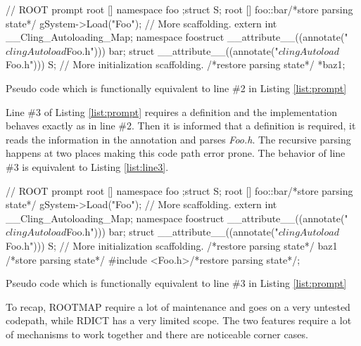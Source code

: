 \documentclass{webofc}
\begin{document}
\begin{listing}[h]
    \noindent
    \begin{minipage}[h]{.7\textwidth}
    \begin{cppcode*}{}
    // ROOT prompt
    root [] namespace foo { };struct S;
    root [] foo::bar/*store parsing state*/
        gSystem->Load("Foo");
        // More scaffolding.
        extern int __Cling_Autoloading_Map;
        namespace foo{struct __attribute__((annotate("$clingAutoload$Foo.h"))) bar;}
        struct __attribute__((annotate("$clingAutoload$Foo.h"))) S;
        // More initialization scaffolding.
        /*restore parsing state*/ *baz1;
    \end{cppcode*}
    \end{minipage}
    \caption{Pseudo code which is functionally equivalent to line \#2 in Listing \ref{list:prompt}}
    \label{list:line2}
\end{listing}

Line \#3 of Listing \ref{list:prompt} requires a definition and the implementation behaves exactly as in line \#2. Then it is informed that a definition is required, it reads the information in the annotation and parses {\it Foo.h}. The recursive parsing happens at two places making this code path error prone. The behavior of line \#3 is equivalent to Listing \ref{list:line3}.

\begin{listing}[h]
    \noindent
    \begin{minipage}[h]{.7\textwidth}
    \begin{cppcode*}{}
    // ROOT prompt
    root [] namespace foo { };struct S;
    root [] foo::bar/*store parsing state*/
        gSystem->Load("Foo");
        // More scaffolding.
        extern int __Cling_Autoloading_Map;
        namespace foo{struct __attribute__((annotate("$clingAutoload$Foo.h"))) bar;}
        struct __attribute__((annotate("$clingAutoload$Foo.h"))) S;
        // More initialization scaffolding.
        /*restore parsing state*/ baz1 /*store parsing state*/
        #include <Foo.h>/*restore parsing state*/;
    \end{cppcode*}
    \end{minipage}
    \caption{Pseudo code which is functionally equivalent to line \#3 in Listing \ref{list:prompt}}
    \label{list:line3}
\end{listing}

To recap, ROOTMAP require a lot of maintenance and goes on a very untested codepath, while RDICT has a very limited scope. The two features require a lot of mechanisms to work together and there are noticeable corner cases.
\end{document}
